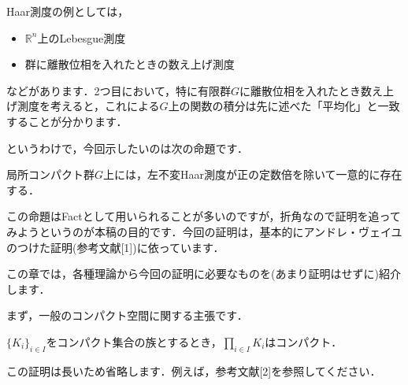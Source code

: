 Haar測度の例としては，
\begin{itemize}
 \item $\mathbb{R}^n$上のLebesgue測度
 \item 群に離散位相を入れたときの数え上げ測度
\end{itemize}
などがあります．2つ目において，特に有限群$G$に離散位相を入れたとき数え上げ測度を考えると，これによる$G$上の関数の積分は先に述べた「平均化」と一致することが分かります．

というわけで，今回示したいのは次の命題です．

\begin{yprop}[Haar測度の存在と一意性]\label{2}
局所コンパクト群$G$上には，左不変Haar測度が正の定数倍を除いて一意的に存在する．
\end{yprop}
この命題はFactとして用いられることが多いのですが，折角なので証明を追ってみようというのが本稿の目的です．今回の証明は，基本的にアンドレ・ヴェイユのつけた証明(参考文献[1])に依っています．

この章では，各種理論から今回の証明に必要なものを(あまり証明はせずに)紹介します．

まず，一般のコンパクト空間に関する主張です．

\begin{ythm}[Tychonoffの定理]\label{3}
$\{ K_i \} _{i \in I}$をコンパクト集合の族とするとき，$\prod_{i \in I} K_i$はコンパクト．
\end{ythm}
この証明は長いため省略します．例えば，参考文献[2]を参照してください．

